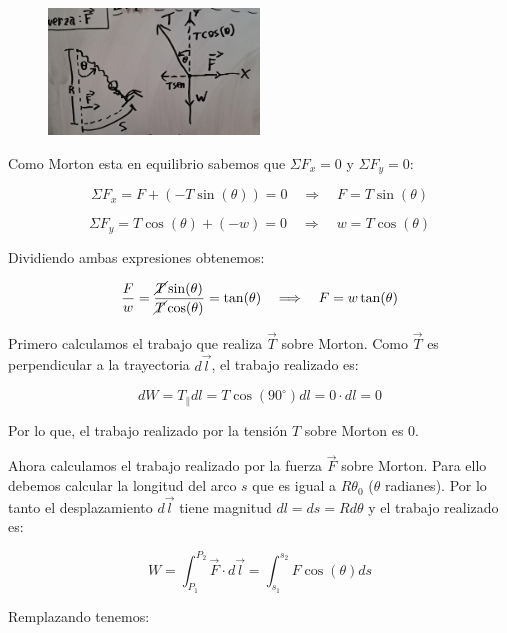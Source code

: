 \documentclass{article}
\begin{document}
    \begin{figure}[H]
        \centering
        \includegraphics[width=0.5\textwidth]{img/5.3-7.png}
    \end{figure}

    \par Como Morton esta en equilibrio sabemos que $\Sigma F_x = 0$ y $\Sigma F_y = 0$:

    \[ \Sigma F_x = F + (-T \sin(\theta)) = 0 \quad \Longrightarrow \quad F = T \sin(\theta) \]

    \[ \Sigma F_y = T \cos(\theta) + (-w) = 0 \quad \Longrightarrow \quad w = T \cos(\theta) \]

    \par Dividiendo ambas expresiones obtenemos:

    \[ \frac{F}{w} = \frac{\cancel{T} \sin(\theta)}{\cancel{T} \cos(\theta)} = \tan(\theta) \quad \Longrightarrow \quad F = w \tan(\theta) \]

    \par Primero calculamos el trabajo que realiza $\vec{T}$ sobre Morton. Como $\vec{T}$ es perpendicular a la trayectoria $d\vec{l}$, el trabajo realizado es:

    \[ dW = T_{\parallel} dl = T \cos(90^\circ) dl = 0 \cdot dl = 0 \]

    \par Por lo que, el trabajo realizado por la tensión $T$ sobre Morton es 0.

    \vspace{0.5cm}

    \par Ahora calculamos el trabajo realizado por la fuerza $\vec{F}$ sobre Morton. Para ello debemos calcular la longitud del arco $s$ que es igual a $R \theta_0$ ($\theta$ radianes). Por lo tanto el desplazamiento $d\vec{l}$ tiene magnitud $dl = ds = R d\theta$ y el trabajo realizado es:

    \[ W = \int_{P_1}^{P_2} \vec{F} \cdot d\vec{l} = \int_{s_1}^{s_2} F \cos(\theta) ds \]

    \par Remplazando tenemos:
\end{document}
